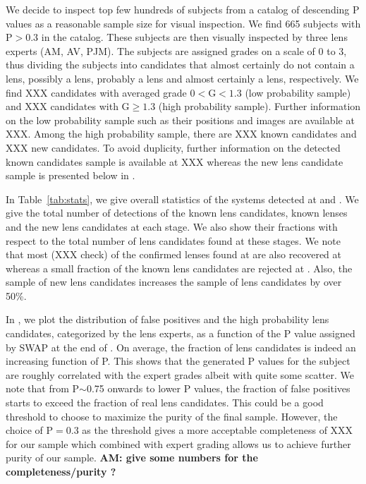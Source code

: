 \documentclass[useAMS,usenatbib,a4paper]{mn2e}
\begin{document}
We decide to inspect top few hundreds of subjects from a catalog of descending P
values as a reasonable sample size for visual inspection. We find 665 subjects
with P$>0.3$ in the catalog. These subjects are then visually inspected by three
lens experts (AM, AV, PJM). The subjects are assigned grades on a scale of 0 to
3, thus dividing the subjects into candidates that almost certainly do not
contain a lens, possibly a lens, probably a lens and almost certainly a lens,
respectively. We find XXX candidates with averaged grade $0<$G$<1.3$ (low
probability sample) and XXX candidates with G$\ge1.3$ (high probability sample).
Further information on the low probability sample such as their positions and
images are available at XXX. Among the high probability sample, there are XXX
known candidates and XXX new candidates. To avoid duplicity, further information
on the \sw detected known candidates sample is available at XXX whereas the new
lens candidate sample is presented below in .

In Table~\ref{tab:stats}, we give overall statistics of the systems detected at
\StageOne and \StageTwo. We give the total number of detections of the known lens
candidates, known lenses and the new lens candidates at each stage.  We also
show their fractions with respect to the total number of lens candidates found
at these stages. We note that most (XXX check) of the confirmed lenses found at
\StageOne are also recovered at \StageTwo whereas a small fraction of the known
lens candidates are rejected at \StageTwo. Also, the sample of new lens
candidates increases the sample of \cfhtls lens candidates by over 50\%.

In , we plot the distribution of false positives and the high
probability lens candidates, categorized by the lens experts, as a function of
the P value assigned by SWAP at the end of \StageTwo. On average, the fraction of
lens candidates is indeed an increasing function of P. This shows that the \sw
generated P values for the subject are roughly correlated with the expert grades
albeit with quite some scatter.  We note that from P$\sim$0.75 onwards to lower
P values, the fraction of false positives starts to exceed the fraction of real
lens candidates. This could be a good threshold to choose to maximize the purity
of the final sample. However, the choice of P$=$0.3 as the threshold gives a
more acceptable completeness of XXX for our sample which combined with expert
grading allows us to achieve further purity of our sample.
{\bf AM: give some numbers for the completeness/purity ?}
\end{document}
